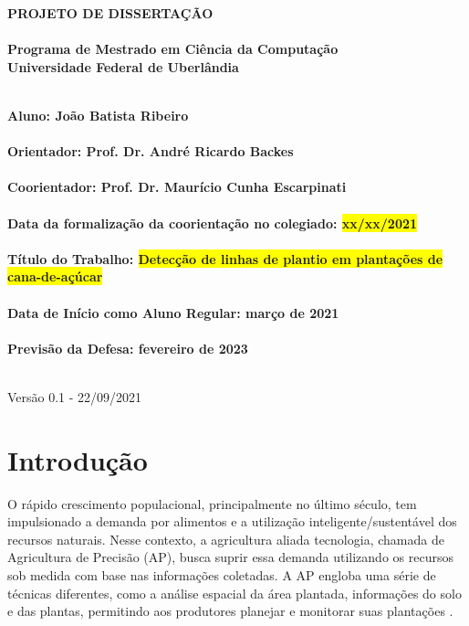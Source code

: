 \documentclass[12pt, a4paper, english, brazil]{article}
\newcommand{\textRed}[1]{{{\color{red} #1}}}
\begin{document}
\rhead{\thepage}

\begin{center}
	\bf{\LARGE{PROJETO DE DISSERTAÇÃO}\\ $\ $\\}
	\Large{Programa de Mestrado em Ciência da Computação\\
		Universidade Federal de Uberlândia}\\ $\ $\\
\end{center}

\begin{center}
	\bf{Aluno: João Batista Ribeiro\\ $\ $\\
		Orientador: Prof. Dr. André Ricardo Backes\\ $\ $\\
		Coorientador: Prof. Dr. Maurício Cunha Escarpinati\\ $\ $\\
		Data da formalização da coorientação no colegiado: \colorbox{yellow}{xx/xx/2021}\\ $\ $\\
		Título do Trabalho: \colorbox{yellow}{Detecção de linhas de plantio em plantações de cana-de-açúcar}\\ $\ $\\
		Data de Início como Aluno Regular: março de 2021\\ $\ $\\
		Previsão da Defesa: fevereiro de 2023\\ $\ $\\}
\end{center}

\textRed{Versão 0.1 - 22/09/2021}

\section{Introdução}

O rápido crescimento populacional, principalmente no último século, tem impulsionado a demanda por alimentos e a utilização inteligente/sustentável dos recursos naturais. Nesse contexto, a agricultura aliada tecnologia, chamada de Agricultura de Precisão (AP), busca suprir essa demanda utilizando os recursos sob medida com base nas informações coletadas. A AP engloba uma série de técnicas diferentes, como a análise espacial da área plantada, informações do solo e das plantas, permitindo aos produtores planejar e monitorar suas plantações \cite{Blasch_2020}.
\end{document}
